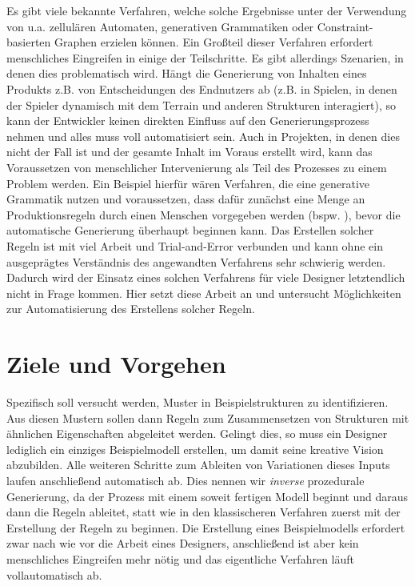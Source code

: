 Es gibt viele bekannte Verfahren, welche solche Ergebnisse unter der Verwendung von u.a. zellulären Automaten, generativen
Grammatiken oder Constraint-basierten Graphen erzielen können. \cite{5_van_der_linden_et_al} Ein Großteil dieser Verfahren erfordert
menschliches Eingreifen in einige der Teilschritte. Es gibt allerdings Szenarien, in denen dies problematisch wird. Hängt die Generierung von
Inhalten eines Produkts z.B. von Entscheidungen des Endnutzers ab (z.B. in Spielen, in denen der Spieler dynamisch mit
dem Terrain und anderen Strukturen interagiert), so kann der Entwickler keinen direkten Einfluss auf den Generierungsprozess
nehmen und alles muss voll automatisiert sein. \cite{14_carli_et_al} Auch in Projekten, in denen dies nicht der Fall ist und der gesamte Inhalt
im Voraus erstellt wird, kann das Voraussetzen von menschlicher Intervenierung als Teil des Prozesses zu einem Problem werden.
Ein Beispiel hierfür wären Verfahren, die eine generative Grammatik nutzen und voraussetzen, dass dafür zunächst eine Menge an Produktionsregeln
durch einen Menschen vorgegeben werden (bspw. \cite{33_adams}), bevor die automatische Generierung überhaupt beginnen kann. Das Erstellen solcher
Regeln ist mit viel Arbeit und Trial-and-Error verbunden und kann ohne ein ausgeprägtes Verständnis des angewandten Verfahrens sehr schwierig werden.
Dadurch wird der Einsatz eines solchen Verfahrens für viele Designer letztendlich nicht in Frage kommen.
Hier setzt diese Arbeit an und untersucht Möglichkeiten zur Automatisierung des Erstellens solcher Regeln.

\section{Ziele und Vorgehen}
Spezifisch soll versucht werden, Muster in Beispielstrukturen zu identifizieren. Aus diesen Mustern sollen dann Regeln zum Zusammensetzen
von Strukturen mit ähnlichen Eigenschaften abgeleitet werden. Gelingt dies, so muss ein Designer lediglich ein einziges Beispielmodell erstellen,
um damit seine kreative Vision abzubilden. Alle weiteren Schritte zum Ableiten von Variationen dieses Inputs laufen anschließend automatisch ab.
Dies nennen wir \textit{inverse} prozedurale Generierung,
da der Prozess mit einem soweit fertigen Modell beginnt und daraus dann die Regeln ableitet, statt wie in den klassischeren Verfahren zuerst mit
der Erstellung der Regeln zu beginnen. Die Erstellung eines Beispielmodells erfordert zwar nach wie vor die Arbeit eines Designers, anschließend
ist aber kein menschliches Eingreifen mehr nötig und das eigentliche Verfahren läuft vollautomatisch ab.

